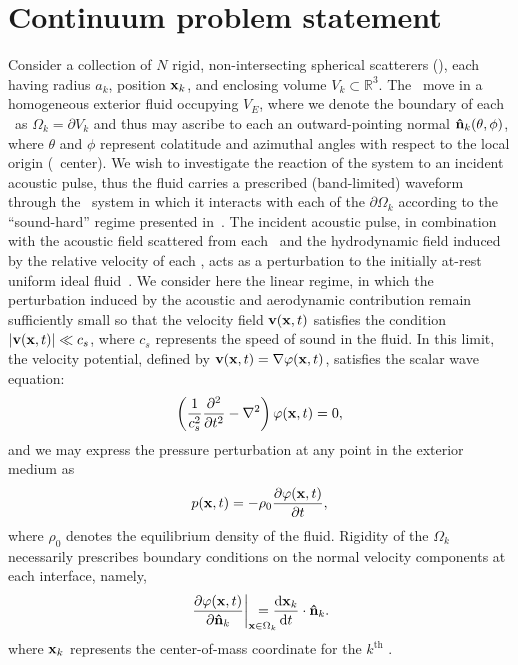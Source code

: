 \section{Continuum problem statement}

Consider a collection of $N$ rigid, non-intersecting spherical scatterers (\bubbles), each having radius $a_k$, position $\vb{x}_k$, and enclosing volume $V_k \subset \mathbb{R}^3$.
The \bubbles\ move in a homogeneous exterior fluid occupying $V_E$, where we denote the boundary of each \bubble\ as $\Omega_k = \partial V_k$ and thus may ascribe  to each an outward-pointing normal $\vu{n}_k\qty(\theta, \phi)$,
where $\theta$ and $\phi$ represent colatitude and azimuthal angles with respect to the local origin (\bubble\ center).
We wish to investigate the reaction of the system to an incident acoustic pulse, thus the fluid carries a prescribed (band-limited) waveform through the \bubble\ system in which it interacts with each of the $\partial \Omega_k$ according to the ``sound-hard'' regime presented in~\cite{Li2014}. 
The incident acoustic pulse, in combination with the acoustic field scattered from each \bubble\ and the hydrodynamic field induced by the relative velocity of each \bubble, acts as a perturbation to the initially at-rest uniform ideal fluid~\cite{Myers1992, Landau2013}.
We consider here the linear regime, in which the perturbation induced by the acoustic and aerodynamic contribution remain sufficiently small so that the velocity field $\vb{v}(\vb{x}, t)$ satisfies the condition $\abs{\vb{v}(\vb{x}, t)} \ll c_s $, where $c_s$ represents the speed of sound in the fluid.
In this limit, the velocity potential, defined by $\vb{v}(\vb{x}, t) = \nabla \varphi\qty(\vb{x}, t)$, satisfies the scalar wave equation:
\begin{equation}
    \left(\frac{1}{c_s^2} \frac{\partial^2}{\partial t^2}-\nabla^2\right) \varphi\qty(\vb{x}, t) = 0,
  \label{eq:Helmholtz}
\end{equation}
and we may express the pressure perturbation at any point in the exterior medium as
\begin{equation} \label{eq:Bernoulli}
  p\qty(\vb{x}, t) = - \rho_0\pdv{\varphi\qty(\vb{x}, t)}{t},
\end{equation}
where $\rho_0$ denotes the equilibrium density of the fluid.
Rigidity of the $\Omega_k$ necessarily prescribes boundary conditions on the normal velocity components at each interface, namely,
\begin{equation}
  \left.\pdv{\varphi(\vb{x},t)}{\vu{n}_k}\right|_{\vb{x} \in \Omega_k} \mkern-30mu = \dv{\vb{x}_k}{t} \cdot \vu{n}_k.
  \label{eq:boundary_conditions}
\end{equation}
where $\vb{x}_k$ represents the center-of-mass coordinate for the $k^\text{th}$ \bubble.


